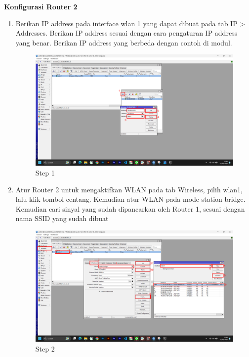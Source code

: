 \begin{center}
	\textbf{Konfigurasi Router 2}
	\begin{enumerate}
		\item Berikan IP address pada interface wlan 1 yang dapat dibuat pada tab IP > Addresses. Berikan IP address sesuai dengan cara pengaturan IP address yang benar. Berikan IP address yang berbeda dengan contoh di modul.
		\begin{figure}[H]
			\centering
			\includegraphics[width=0.9\linewidth]{P1/img/per1/pc2/Step 2.png}
			\caption{Step 1}
			\label{fig:Step 1(Per.2 PC2)}
		\end{figure}
		\item Atur Router 2 untuk mengaktifkan WLAN pada tab Wireless, pilih wlan1, lalu klik tombol centang. Kemudian atur WLAN pada mode station bridge. Kemudian cari sinyal yang sudah dipancarkan oleh Router 1, sesuai dengan nama SSID yang sudah dibuat
		\begin{figure}[H]
			\centering
			\includegraphics[width=0.9\linewidth]{P1/img/per2/pc2/Step 3.png}
			\caption{Step 2}
			\label{fig:Step 2(Per.2 PC2)}
		\end{figure}
	\end{enumerate}


\end{center}
